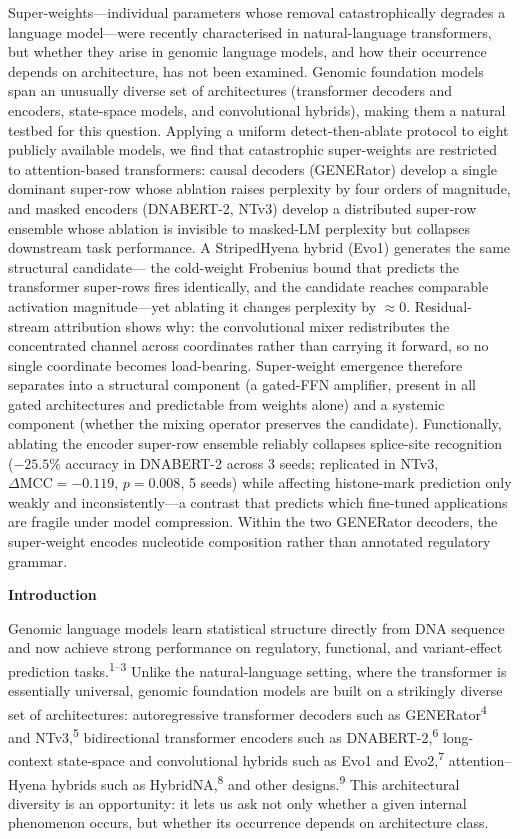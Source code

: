 \documentclass[11pt]{article}
\begin{document}
Super-weights---individual parameters whose removal catastrophically
degrades a language model---were recently characterised in
natural-language transformers, but whether they arise in genomic
language models, and how their occurrence depends on architecture, has
not been examined. Genomic foundation models span an unusually diverse
set of architectures (transformer decoders and encoders, state-space
models, and convolutional hybrids), making them a natural testbed for
this question. Applying a uniform detect-then-ablate protocol to eight
publicly available models, we find that catastrophic super-weights are
restricted to attention-based transformers: causal decoders (GENERator)
develop a single dominant super-row whose ablation raises perplexity by
four orders of magnitude, and masked encoders (DNABERT-2, NTv3) develop
a distributed super-row ensemble whose ablation is invisible to
masked-LM perplexity but collapses downstream task performance. A
StripedHyena hybrid (Evo1) generates the same structural candidate---
the cold-weight Frobenius bound that predicts the transformer super-rows
fires identically, and the candidate reaches comparable activation
magnitude---yet ablating it changes perplexity by $\approx 0$.
Residual-stream attribution shows why: the convolutional mixer
redistributes the concentrated channel across coordinates rather than
carrying it forward, so no single coordinate becomes load-bearing.
Super-weight emergence therefore separates into a structural component
(a gated-FFN amplifier, present in all gated architectures and
predictable from weights alone) and a systemic component (whether the
mixing operator preserves the candidate). Functionally, ablating the
encoder super-row ensemble reliably collapses splice-site recognition
($-25.5\%$ accuracy in DNABERT-2 across 3 seeds; replicated in NTv3,
$\Delta\mathrm{MCC} = -0.119$, $p = 0.008$, 5 seeds) while affecting
histone-mark prediction only weakly and inconsistently---a contrast
that predicts which fine-tuned applications are fragile under model
compression. Within the two GENERator decoders, the super-weight
encodes nucleotide composition rather than annotated regulatory
grammar.

\textbf{Introduction}

Genomic language models learn statistical structure directly from DNA
sequence and now achieve strong performance on regulatory, functional,
and variant-effect prediction tasks.\textsuperscript{1--3} Unlike the
natural-language setting, where the transformer is essentially
universal, genomic foundation models are built on a strikingly diverse
set of architectures: autoregressive transformer decoders such as
GENERator\textsuperscript{4} and NTv3,\textsuperscript{5} bidirectional
transformer encoders such as DNABERT-2,\textsuperscript{6} long-context
state-space and convolutional hybrids such as Evo1 and
Evo2,\textsuperscript{7} attention--Hyena hybrids such as
HybridNA,\textsuperscript{8} and other designs.\textsuperscript{9} This
architectural diversity is an opportunity: it lets us ask not only
whether a given internal phenomenon occurs, but whether its occurrence
depends on architecture class.
\end{document}
